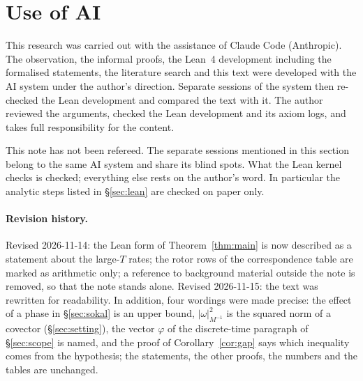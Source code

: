 \documentclass[11pt,a4paper]{article}
\theoremstyle{definition}
\theoremstyle{remark}
\begin{document}
\section{Use of AI}\label{sec:ai}

This research was carried out with the assistance of Claude Code (Anthropic). The observation, the informal proofs, the Lean~4 development including the formalised statements, the literature search and this text were developed with the AI system under the author's direction. Separate sessions of the system then re-checked the Lean development and compared the text with it. The author reviewed the arguments, checked the Lean development and its axiom logs, and takes full responsibility for the content.

This note has not been refereed. The separate sessions mentioned in this section belong to the same AI system and share its blind spots. What the Lean kernel checks is checked; everything else rests on the author's word. In particular the analytic steps listed in \S\ref{sec:lean} are checked on paper only.

\paragraph{Revision history.} Revised 2026-11-14: the Lean form of Theorem~\ref{thm:main} is now described as a statement about the large-$T$ rates; the rotor rows of the correspondence table are marked as arithmetic only; a reference to background material outside the note is removed, so that the note stands alone. Revised 2026-11-15: the text was rewritten for readability. In addition, four wordings were made precise: the effect of a phase in \S\ref{sec:sokal} is an upper bound, $|\omega|_{M^{-1}}^2$ is the squared norm of a covector (\S\ref{sec:setting}), the vector $\varphi$ of the discrete-time paragraph of \S\ref{sec:scope} is named, and the proof of Corollary~\ref{cor:gap} says which inequality comes from the hypothesis; the statements, the other proofs, the numbers and the tables are unchanged.
\end{document}
